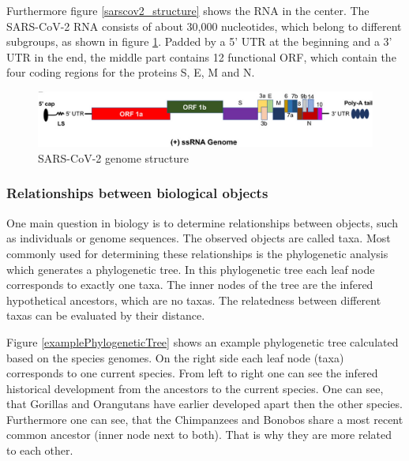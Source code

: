 Furthermore figure \ref{sarscov2_structure} shows the \ac{RNA} in the center. The \ac{SARS-CoV-2} \ac{RNA} consists of about 30,000 nucleotides, which belong to different subgroups, as shown in figure \ref{sarscov2GenomeStructure}. 
Padded by a 5' \ac{UTR} at the beginning and a 3' \ac{UTR} in the end, the middle part contains 12 functional \ac{ORF}, which contain the four coding regions for the proteins S, E, M and N. 

\begin{figure}[ht]
	\centering
	\includegraphics[width=1.0\linewidth]{figures/sarscov2GenomeStructure.png}
	\caption{SARS-CoV-2 genome structure \cite{NAQVI2020165878}}
	\label{sarscov2GenomeStructure}
\end{figure}

\subsubsection{Relationships between biological objects} \label{fundamentalsA0d}

One main question in biology is to determine relationships between objects, such as individuals or genome sequences. The observed objects are called taxa. Most commonly used for determining these relationships is the phylogenetic analysis which generates a phylogenetic tree. In this phylogenetic tree each leaf node corresponds to exactly one taxa. The inner nodes of the tree are the infered hypothetical ancestors, which are no taxas. The relatedness between different taxas can be evaluated by their distance. \cite{böckenhauer2013algorithmische}

Figure \ref{examplePhylogeneticTree} shows an example phylogenetic tree calculated based on the species genomes. On the right side each leaf node (taxa) corresponds to one current species. From left to right one can see the infered historical development from the ancestors to the current species. One can see, that Gorillas and Orangutans have earlier developed apart then the other species. Furthermore one can see, that the  Chimpanzees and Bonobos share a most recent common ancestor (inner node next to both). That is why they are more related to each other. \cite{mallawaarachchiMolecularPhylogeneticsUsing2018}

